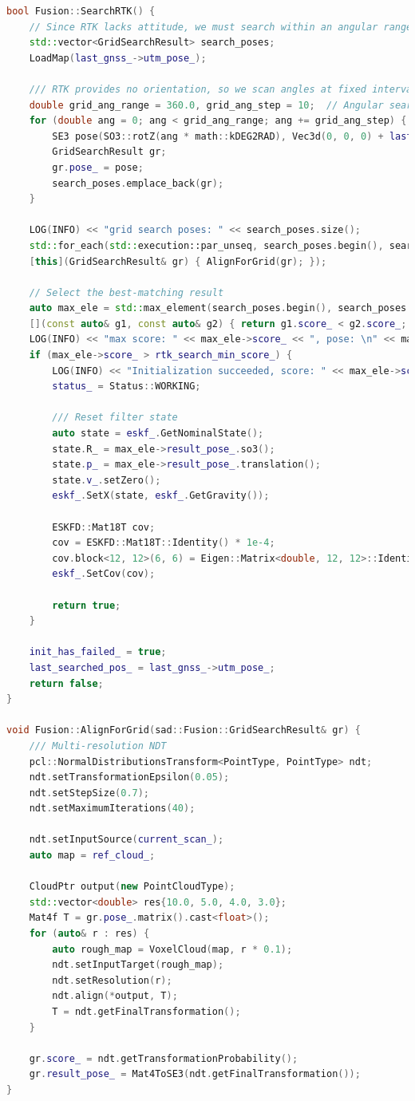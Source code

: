 \begin{lstlisting}[language=c++,caption=/ch10/fusion.cc]  
bool Fusion::SearchRTK() {  
	// Since RTK lacks attitude, we must search within an angular range  
	std::vector<GridSearchResult> search_poses;  
	LoadMap(last_gnss_->utm_pose_);  
	
	/// RTK provides no orientation, so we scan angles at fixed intervals  
	double grid_ang_range = 360.0, grid_ang_step = 10;  // Angular search range and step  
	for (double ang = 0; ang < grid_ang_range; ang += grid_ang_step) {  
		SE3 pose(SO3::rotZ(ang * math::kDEG2RAD), Vec3d(0, 0, 0) + last_gnss_->utm_pose_.translation());  
		GridSearchResult gr;  
		gr.pose_ = pose;  
		search_poses.emplace_back(gr);  
	}  
	
	LOG(INFO) << "grid search poses: " << search_poses.size();  
	std::for_each(std::execution::par_unseq, search_poses.begin(), search_poses.end(),  
	[this](GridSearchResult& gr) { AlignForGrid(gr); });  
	
	// Select the best-matching result  
	auto max_ele = std::max_element(search_poses.begin(), search_poses.end(),  
	[](const auto& g1, const auto& g2) { return g1.score_ < g2.score_; });  
	LOG(INFO) << "max score: " << max_ele->score_ << ", pose: \n" << max_ele->result_pose_.matrix();  
	if (max_ele->score_ > rtk_search_min_score_) {  
		LOG(INFO) << "Initialization succeeded, score: " << max_ele->score_ << ">" << rtk_search_min_score_;  
		status_ = Status::WORKING;  
		
		/// Reset filter state  
		auto state = eskf_.GetNominalState();  
		state.R_ = max_ele->result_pose_.so3();  
		state.p_ = max_ele->result_pose_.translation();  
		state.v_.setZero();  
		eskf_.SetX(state, eskf_.GetGravity());  
		
		ESKFD::Mat18T cov;  
		cov = ESKFD::Mat18T::Identity() * 1e-4;  
		cov.block<12, 12>(6, 6) = Eigen::Matrix<double, 12, 12>::Identity() * 1e-6;  
		eskf_.SetCov(cov);  
		
		return true;  
	}  
	
	init_has_failed_ = true;  
	last_searched_pos_ = last_gnss_->utm_pose_;  
	return false;  
}  

void Fusion::AlignForGrid(sad::Fusion::GridSearchResult& gr) {  
	/// Multi-resolution NDT  
	pcl::NormalDistributionsTransform<PointType, PointType> ndt;  
	ndt.setTransformationEpsilon(0.05);  
	ndt.setStepSize(0.7);  
	ndt.setMaximumIterations(40);  
	
	ndt.setInputSource(current_scan_);  
	auto map = ref_cloud_;  
	
	CloudPtr output(new PointCloudType);  
	std::vector<double> res{10.0, 5.0, 4.0, 3.0};  
	Mat4f T = gr.pose_.matrix().cast<float>();  
	for (auto& r : res) {  
		auto rough_map = VoxelCloud(map, r * 0.1);  
		ndt.setInputTarget(rough_map);  
		ndt.setResolution(r);  
		ndt.align(*output, T);  
		T = ndt.getFinalTransformation();  
	}  
	
	gr.score_ = ndt.getTransformationProbability();  
	gr.result_pose_ = Mat4ToSE3(ndt.getFinalTransformation());  
}  
\end{lstlisting}



